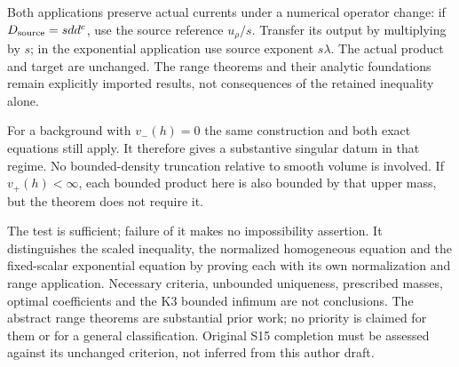 \documentclass[11pt]{article}
\newcommand{\ddc}{dd^c}
\begin{document}
Both applications preserve actual currents under a numerical operator
change: if $D_{\rm source}=s\ddc$, use the source reference
$u_\rho/s$. Transfer its output by multiplying by $s$; in the
exponential application use source exponent $s\lambda$.
The actual product and target are unchanged. The range theorems and
their analytic foundations remain explicitly imported results, not
consequences of the retained inequality alone.

For a background with $v_-(h)=0$ the same construction and both exact
equations still apply. It therefore gives a substantive singular datum
in that regime. No bounded-density truncation relative to smooth volume
is involved. If $v_+(h)<\infty$, each bounded product here is also
bounded by that upper mass, but the theorem does not require it.

The test is sufficient; failure of it makes no impossibility assertion.
It distinguishes the scaled inequality, the normalized homogeneous
equation and the fixed-scalar exponential equation by proving each with
its own normalization and range application. Necessary criteria,
unbounded uniqueness, prescribed masses, optimal coefficients and the
K3 bounded infimum are not conclusions. The abstract range theorems
are substantial prior work; no priority is claimed for them or for a
general classification. Original S15 completion must be assessed
against its unchanged criterion, not inferred from this author draft.
\end{document}
